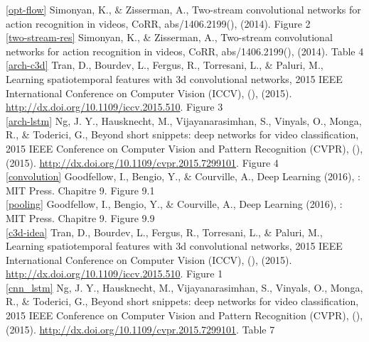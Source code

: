 \documentclass[11pt]{article}
\begin{document}
\ref{opt-flow} Simonyan, K., \& Zisserman, A., Two-stream convolutional networks for action recognition in videos, CoRR, abs/1406.2199(),  (2014). Figure 2\\

\ref{two-stream-res} Simonyan, K., \& Zisserman, A., Two-stream convolutional networks for action recognition in videos, CoRR, abs/1406.2199(),  (2014). Table 4\\

\ref{arch-c3d} Tran, D., Bourdev, L., Fergus, R., Torresani, L., \& Paluri, M., Learning spatiotemporal features with 3d convolutional networks, 2015 IEEE International Conference on Computer Vision (ICCV), (),  (2015).  \url{http://dx.doi.org/10.1109/iccv.2015.510}. Figure 3\\

\ref{arch-lstm} Ng, J. Y., Hausknecht, M., Vijayanarasimhan, S., Vinyals, O., Monga, R., \& Toderici, G., Beyond short snippets: deep networks for video classification, 2015 IEEE Conference on Computer Vision and Pattern Recognition (CVPR), (),  (2015).  \url{http://dx.doi.org/10.1109/cvpr.2015.7299101}. Figure 4\\

\ref{convolution} Goodfellow, I., Bengio, Y., \& Courville, A., Deep Learning (2016), : MIT Press. Chapitre 9. Figure 9.1\\

\ref{pooling} Goodfellow, I., Bengio, Y., \& Courville, A., Deep Learning (2016), : MIT Press. Chapitre 9. Figure 9.9\\

\ref{c3d-idea} Tran, D., Bourdev, L., Fergus, R., Torresani, L., \& Paluri, M., Learning spatiotemporal features with 3d convolutional networks, 2015 IEEE International Conference on Computer Vision (ICCV), (),  (2015).  \url{http://dx.doi.org/10.1109/iccv.2015.510}. Figure 1\\

\ref{cnn_lstm} Ng, J. Y., Hausknecht, M., Vijayanarasimhan, S., Vinyals, O., Monga, R., \& Toderici, G., Beyond short snippets: deep networks for video classification, 2015 IEEE Conference on Computer Vision and Pattern Recognition (CVPR), (),  (2015).  \url{http://dx.doi.org/10.1109/cvpr.2015.7299101}. Table 7\\


\end{document}
